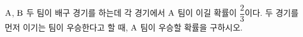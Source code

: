 $\mathrm{A}$, $\mathrm{B}$ 두 팀이 배구 경기를 하는데 각 경기에서 $\mathrm{A}$ 팀이 이길 확률이 $\dfrac{2}{3}$이다. 두 경기를 먼저 이기는 팀이 우승한다고 할 때, $\mathrm{A}$ 팀이 우승할 확률을 구하시오. 

